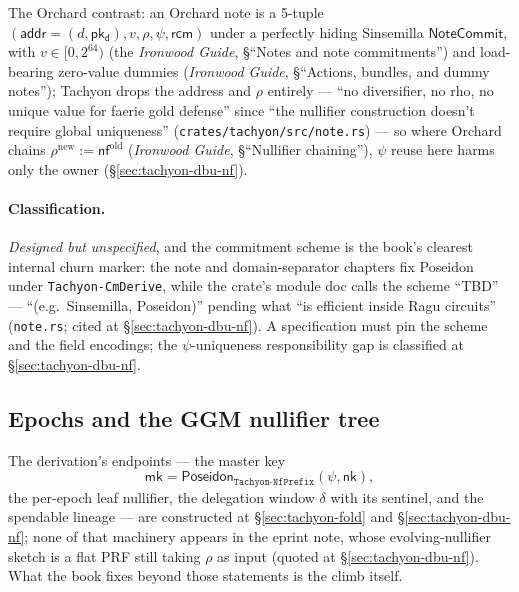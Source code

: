 \documentclass[11pt,a4paper]{article}
\theoremstyle{definition}
\newcommand{\nfsym}{\mathsf{nf}}
\newcommand{\NoteCommit}{\ensuremath{\mathsf{NoteCommit}}}
\newcommand{\nksym}{\ensuremath{\mathsf{nk}}}
\newcommand{\pkd}{\ensuremath{\mathsf{pk_d}}}
\newcommand{\rcm}{\ensuremath{\mathsf{rcm}}}
\begin{document}
The Orchard contrast: an Orchard note is a 5-tuple
$(\mathsf{addr} = (d, \pkd), v, \rho, \psi, \rcm)$ under a perfectly
hiding Sinsemilla $\NoteCommit$, with $v \in [0, 2^{64})$ (the
\emph{Ironwood Guide}, \S``Notes and note commitments'') and load-bearing
zero-value dummies (\emph{Ironwood Guide},
\S``Actions, bundles, and dummy notes''); Tachyon drops the address and
$\rho$ entirely --- ``no diversifier, no rho, no unique value for faerie
gold defense'' since ``the nullifier construction doesn't require global
uniqueness'' (\texttt{crates/tachyon/src/note.rs}) --- so where Orchard
chains $\rho^{\mathrm{new}} := \nfsym^{\mathrm{old}}$ (\emph{Ironwood
Guide}, \S``Nullifier chaining''), $\psi$ reuse
here harms only the owner (\S\ref{sec:tachyon-dbu-nf}).

\paragraph{Classification.} \emph{Designed but unspecified}, and the
commitment scheme is the book's clearest internal churn marker: the note
and domain-separator chapters fix Poseidon under \texttt{Tachyon-CmDerive},
while the crate's module doc calls the scheme ``TBD'' --- ``(e.g.\
Sinsemilla, Poseidon)'' pending what ``is efficient inside Ragu circuits''
(\texttt{note.rs}; cited at \S\ref{sec:tachyon-dbu-nf}). A specification
must pin the scheme and the field encodings; the $\psi$-uniqueness
responsibility gap is classified at \S\ref{sec:tachyon-dbu-nf}.

\subsection{Epochs and the GGM nullifier tree}\label{sec:tachyon-design-ggm}

The derivation's endpoints --- the master key
\[
  \mathsf{mk} = \mathsf{Poseidon}_{\texttt{Tachyon-NfPrefix}}(\psi, \nksym),
\]
the per-epoch leaf nullifier, the delegation window $\delta$ with its
sentinel, and the spendable lineage --- are constructed at
\S\ref{sec:tachyon-fold} and \S\ref{sec:tachyon-dbu-nf}; none of that
machinery appears in the eprint note, whose evolving-nullifier sketch is a
flat PRF still taking $\rho$ as input (quoted at
\S\ref{sec:tachyon-dbu-nf}).
What the book fixes beyond those statements is the climb itself.
\end{document}
